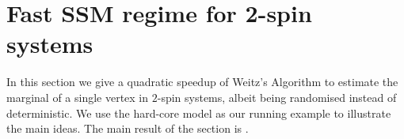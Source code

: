 \documentclass[10pt,a4paper]{article}
\newtheorem{theorem}{Theorem}[section]
\newcommand{\eps}{\varepsilon}
\begin{document}
\section{Fast SSM regime for 2-spin systems}
In this section we give a quadratic speedup of Weitz's Algorithm to estimate the marginal of a single vertex in $2$-spin systems, albeit being randomised instead of deterministic.
We use the hard-core model as our running example to illustrate the main ideas.
The main result of the section is .

\end{document}
